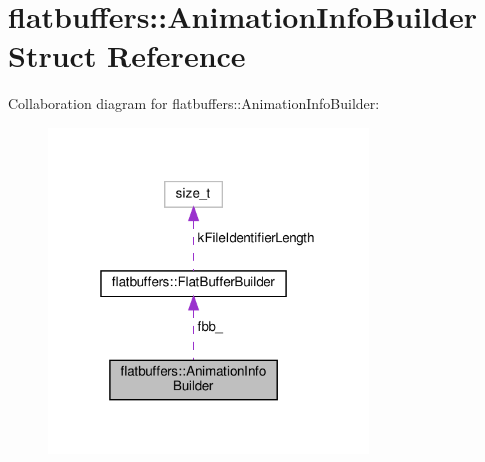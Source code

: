 \hypertarget{structflatbuffers_1_1AnimationInfoBuilder}{}\section{flatbuffers\+:\+:Animation\+Info\+Builder Struct Reference}
\label{structflatbuffers_1_1AnimationInfoBuilder}


Collaboration diagram for flatbuffers\+:\+:Animation\+Info\+Builder\+:
\nopagebreak
\begin{figure}[H]
\begin{center}
\leavevmode
\includegraphics[width=241pt]{structflatbuffers_1_1AnimationInfoBuilder__coll__graph}
\end{center}
\end{figure}
